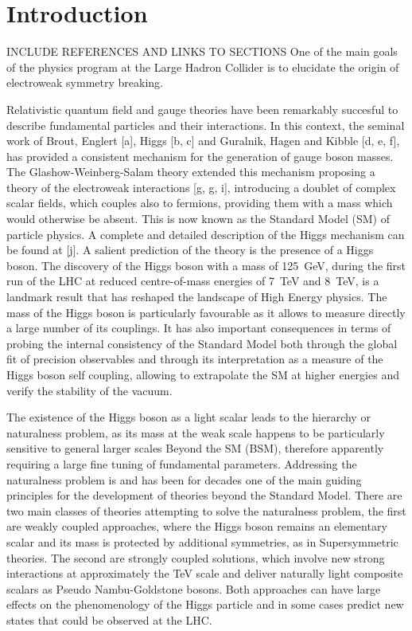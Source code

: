\documentclass[../report.tex]{subfiles}
\begin{document}
\section{Introduction}


{\color{red} INCLUDE REFERENCES AND LINKS TO SECTIONS}
One of the main goals of the physics program at the Large Hadron
Collider is to elucidate the origin of  electroweak symmetry
breaking.

Relativistic quantum field and gauge theories have been remarkably
succesful to describe fundamental particles and their
interactions. %
In this context, the seminal work
of Brout, Englert [a], Higgs [b, c] and Guralnik, Hagen and Kibble
[d, e, f], has provided a consistent mechanism for the generation
of gauge boson masses. %
The Glashow-Weinberg-Salam theory
extended this mechanism proposing a theory of the electroweak
interactions [g, g, i], introducing a doublet of complex scalar
fields, which couples also to fermions, providing them with a  mass  which would otherwise be absent. This is now known as the Standard Model (SM) of particle physics. %
A complete and detailed description of the Higgs mechanism
can be found at [j]. A salient prediction of the theory is the
presence of a Higgs boson.
The discovery of the Higgs boson with a mass of 125~GeV, during the
first run of the LHC at reduced centre-of-mass energies of 7~TeV and
8~TeV, is a landmark result that has reshaped the landscape of High
Energy physics. The mass of the Higgs boson is particularly favourable
as it allows to measure directly a large number of its couplings. It
has also important consequences in terms of probing the internal
consistency of the Standard Model both through the global fit of
precision observables and through its interpretation as a measure of
the Higgs boson self coupling, allowing to extrapolate the SM at
higher energies and verify the stability of the vacuum.

The existence of the Higgs boson as a light scalar leads to the
hierarchy or naturalness problem, as its mass at the weak scale happens to be particularly sensitive to general larger scales Beyond the SM (BSM), therefore apparently requiring a large fine tuning of fundamental parameters.
Addressing the naturalness problem is and has been for decades one of
the main guiding principles for the development of theories beyond the
Standard Model. 
There are two main classes of theories attempting
to solve the naturalness problem, the first are weakly coupled approaches, 
where the Higgs boson
remains an elementary scalar and its mass is protected by additional
symmetries, as in Supersymmetric theories. 
The second are strongly
coupled solutions, which involve new strong interactions at approximately the TeV
scale and deliver naturally light composite scalars as Pseudo Nambu-Goldstone bosons. Both approaches can have large effects on the phenomenology
of the Higgs particle and in some cases predict new states that could be 
observed at the LHC.
\end{document}
